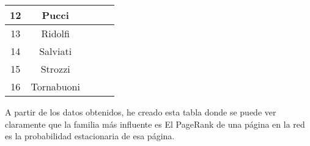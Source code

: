 \begin{center}
\begin{tabular}{|c|c|c|c|c|}
    12 & Pucci & \cellcolor{red!25}{0.02031219384756239} & \cellcolor{red!25}{0.00990099009900966} & \cellcolor{red!25}{0.007345642247369766} \\ \hline
    13 & Ridolfi & \cellcolor{yellow!25}{0.05813785531252352} & \cellcolor{yellow!25}{0.05766828706625104} & \cellcolor{yellow!25}{0.05753848456033725} \\ \hline
    14 & Salviati & \cellcolor{blue!25}{0.07857525064488464} & \cellcolor{blue!25}{0.08867479996044474} & \cellcolor{blue!25}{0.09235401457779774} \\ \hline
    15 & Strozzi & \cellcolor{violet!25}{0.06601505333490647} & \cellcolor{violet!25}{0.06716243109855179} & \cellcolor{violet!25}{0.0673885084397732} \\ \hline
    16 & Tornabuoni & \cellcolor{yellow!25}{0.04914701665134973} & \cellcolor{yellow!25}{0.04510411167989654} & \cellcolor{yellow!25}{0.04383755158579216}\\ \hline
\end{tabular}
\end{center}
\par A partir de los datos obtenidos, he creado esta tabla donde se puede ver claramente que la familia más influente es 
El PageRank de una página en la red es la probabilidad estacionaria de esa página.
